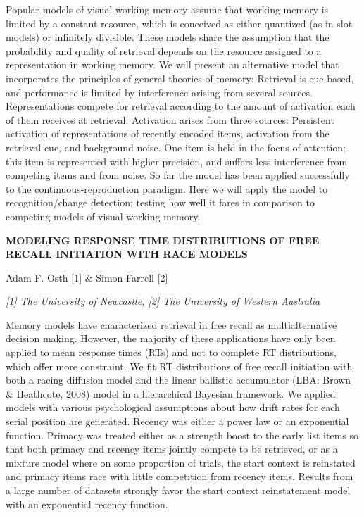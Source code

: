 \documentclass[]{article}
\begin{document}
Popular models of visual working memory assume that working memory is
limited by a constant resource, which is conceived as either quantized
(as in slot models) or infinitely divisible. These models share the
assumption that the probability and quality of retrieval depends on the
resource assigned to a representation in working memory. We will present
an alternative model that incorporates the principles of general
theories of memory: Retrieval is cue-based, and performance is limited
by interference arising from several sources. Representations compete
for retrieval according to the amount of activation each of them
receives at retrieval. Activation arises from three sources: Persistent
activation of representations of recently encoded items, activation from
the retrieval cue, and background noise. One item is held in the focus
of attention; this item is represented with higher precision, and
suffers less interference from competing items and from noise. So far
the model has been applied successfully to the continuous-reproduction
paradigm. Here we will apply the model to recognition/change detection;
testing how well it fares in comparison to competing models of visual
working memory.

\textbf{MODELING RESPONSE TIME DISTRIBUTIONS OF FREE RECALL INITIATION
WITH RACE MODELS}

Adam F. Osth {[}1{]} \& Simon Farrell {[}2{]}

\emph{{[}1{]} The University of Newcastle, {[}2{]} The University of
Western Australia}

Memory models have characterized retrieval in free recall as
multialternative decision making. However, the majority of these
applications have only been applied to mean response times (RTs) and not
to complete RT distributions, which offer more constraint. We fit RT
distributions of free recall initiation with both a racing diffusion
model and the linear ballistic accumulator (LBA: Brown \& Heathcote,
2008) model in a hierarchical Bayesian framework. We applied models with
various psychological assumptions about how drift rates for each serial
position are generated. Recency was either a power law or an exponential
function. Primacy was treated either as a strength boost to the early
list items so that both primacy and recency items jointly compete to be
retrieved, or as a mixture model where on some proportion of trials, the
start context is reinstated and primacy items race with little
competition from recency items. Results from a large number of datasets
strongly favor the start context reinstatement model with an exponential
recency function.
\end{document}
